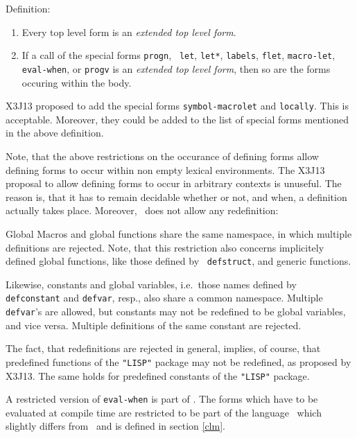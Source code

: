 Definition:
\label{erwTLF}

\begin{enumerate}

\item Every top level form is an {\em extended top level form}.
\item If a call of the special forms {\tt progn}, {\tt
let}, {\tt let*}, {\tt labels}, {\tt flet}, {\tt macro-let}, {\tt
eval-when}, or {\tt progv} is an {\em extended top level form}, then so are 
the forms occuring within the body. 
\end{enumerate}


X3J13 proposed to add the special forms {\tt symbol-macrolet} and
{\tt locally}. This is acceptable. Moreover, they could be added to the list of 
special forms mentioned in the above definition.

Note, that the above restrictions on the occurance of defining forms allow 
defining forms to occur within non empty lexical environments. The X3J13 
proposal to allow defining forms to occur in arbitrary contexts is 
unuseful. The reason is, that it has to remain decidable whether or not, and 
when, a definition actually takes place. Moreover, \ does not allow any 
redefinition:

Global Macros and global functions share the same namespace, in which multiple 
definitions are rejected. Note, that this restriction also concerns 
implicitely defined global functions, like those defined by {\tt 
defstruct}, and generic functions.

Likewise, constants and global variables, i.e.\ those names defined by {\tt 
defconstant} and {\tt defvar}, resp., also share a common namespace. 
Multiple {\tt defvar}'s are allowed, but constants may not be redefined to 
be global variables, and vice versa. Multiple definitions of the same 
constant are rejected.

The fact, that redefinitions are rejected in general, implies, of course, 
that predefined functions of the {\tt "LISP"} package may not be redefined, 
as proposed by X3J13.  The same holds for predefined constants of 
the {\tt "LISP"} package.

A restricted version of {\tt eval-when} is part of . The forms which 
have to be evaluated at compile time are restricted to be part of the 
language \clm\ which slightly differs from \ and is defined in section 
\ref{clm}. 

